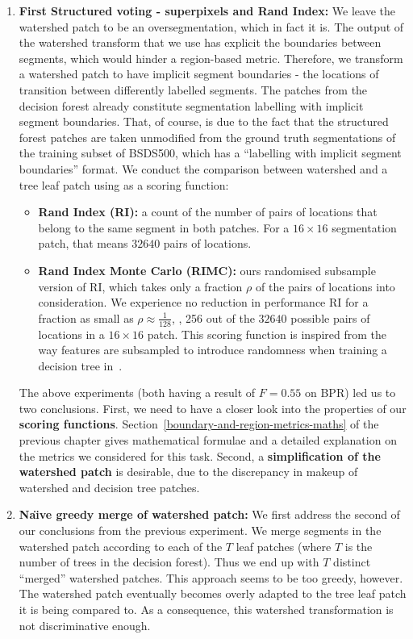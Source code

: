 \begin{enumerate}
\item{\bf First Structured voting - superpixels and Rand Index:} We leave the watershed patch to be an oversegmentation, which in fact it is. The output of the watershed transform that we use has explicit the boundaries between segments, which would hinder a region-based metric. Therefore, we transform a watershed patch to have implicit segment boundaries - the locations of transition between differently labelled segments. The patches from the decision forest already constitute segmentation labelling with implicit segment boundaries. That, of course, is due to the fact that the structured forest patches are taken unmodified from the ground truth segmentations of the training subset of BSDS500, which has a ``labelling with implicit segment boundaries'' format. We conduct the comparison between watershed and a tree leaf patch using as a scoring function:

\begin{itemize}
 \item{\bf Rand Index (RI):} a count of the number of pairs of locations that belong to the same segment in both patches. For a $16\times16$ segmentation patch, that means $32 640$ pairs of locations.
 \item{\bf Rand Index Monte Carlo (RIMC):} ours randomised subsample version of RI, which takes only a fraction $\rho$ of the pairs of locations into consideration. We experience no reduction in performance \wrt RI for a fraction as small as $\rho\approx\frac{1}{128}$, \ie, 256 out of the $32 640$ possible pairs of locations in a $16 \times 16$ patch. This scoring function is inspired from the way features are subsampled to introduce randomness when training a decision tree in~\cite{DollarICCV13edges,Dollar2013toolbox}.
\end{itemize}

 The above experiments (both having a result of $F=0.55$ on BPR) led us to two conclusions. First, we need to have a closer look into the properties of our \textbf{scoring functions}. Section~\ref{boundary-and-region-metrics-maths} of the previous chapter gives mathematical formulae and a detailed explanation on the metrics we considered for this task. Second, a \textbf{simplification of the watershed patch} is desirable, due to the discrepancy %
 in makeup %
 of watershed and decision tree patches.

\item{\bf Na\"{\i}ve greedy merge of watershed patch:} We first address the second of our conclusions from the previous experiment. We merge segments in the watershed patch according to each of the $T$ leaf patches (where $T$ is the number of trees in the decision forest). Thus we end up with $T$ distinct ``merged'' watershed patches. This approach seems to be too greedy, however. The watershed patch eventually becomes overly adapted to the tree leaf patch it is being compared to. As a consequence, this watershed transformation is not discriminative enough.


\end{enumerate}

